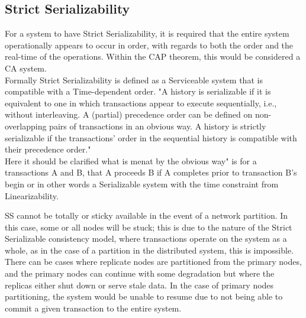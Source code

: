 \documentclass[a4paper,10pt,titlepage]{report}
\begin{document}
    \subsection{Strict Serializability}

    For a system to have Strict Serializability, it is required that the entire system operationally appears to occur in order, with regards to both the order and the real-time of the operations. Within the CAP theorem, this would be considered a CA system.\\
    \vspace{5mm}
    Formally Strict Serializability is defined as a Serviceable system that is compatible with a Time-dependent order.
    "A history is serializable if it is equivalent to one in which transactions appear to execute sequentially, i.e., without interleaving. A (partial) precedence order can be defined on non-overlapping pairs of transactions in an obvious way. A history is strictly serializable if the transactions' order in the sequential history is compatible with their precedence order." \cite{Herlihy1990Linearizability}\\
    \vspace{5mm}
    Here it should be clarified what is menat by the obvious way" is for a transactions A and B, that A proceeds B if A completes prior to transaction B's begin or in other words a Serializable system with the time constraint from Linearizability.

    SS cannot be totally or sticky available in the event of a network partition. In this case, some or all nodes will be stuck; this is due to the nature of the Strict Serializable consistency model, where transactions operate on the system as a whole, as in the case of a partition in the distributed system, this is impossible. There can be cases where replicate nodes are partitioned from the primary nodes, and the primary nodes can continue with some degradation but where the replicas either shut down or serve stale data. In the case of primary nodes partitioning, the system would be unable to resume due to not being able to commit a given transaction to the entire system.
\end{document}
